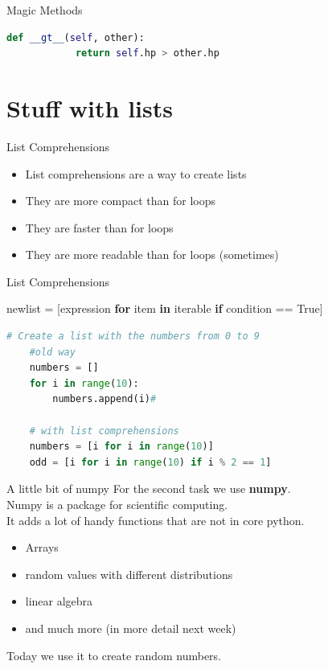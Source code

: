 \documentclass{beamer}
\begin{document}
\begin{frame}[fragile]{Magic Methods}
    \begin{lstlisting}[language=Python]
        def __gt__(self, other):
            return self.hp > other.hp
    \end{lstlisting}
        
    \end{frame}


\section{Stuff with lists}

\begin{frame}{List Comprehensions}
    \begin{itemize}
        \item List comprehensions are a way to create lists
        \item They are more compact than for loops
        \item They are faster than for loops
        \item They are more readable than for loops (sometimes)
    \end{itemize}
\end{frame}

\begin{frame}[fragile]{List Comprehensions}

    newlist = [expression \textbf{for} item \textbf{in} iterable \textbf{if} condition == True]
    \begin{lstlisting}[language=Python]
    # Create a list with the numbers from 0 to 9
    #old way
    numbers = []
    for i in range(10):
        numbers.append(i)#

    # with list comprehensions
    numbers = [i for i in range(10)]
    odd = [i for i in range(10) if i % 2 == 1]
    \end{lstlisting}
\end{frame}

\begin{frame}{A little bit of numpy}
    For the second task we use \textbf{numpy}.\\
    Numpy is a package for scientific computing.\\\pause
    It adds a lot of handy functions that are not in core python.\\\pause
    \begin{itemize}
        \item Arrays
        \item random values with different distributions
        \item linear algebra
        \item and much more (in more detail next week)
    \end{itemize}
    Today we use it to create random numbers.
\end{frame}
\end{document}
